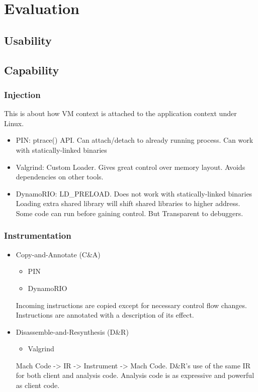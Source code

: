 
\section{Evaluation}
\label{sec:evaluation}
\subsection{Usability}
\subsection{Capability}
\subsubsection{Injection}
This is about how VM context is attached to the application context under Linux.
\begin{itemize}
	\item PIN: ptrace() API.
	Can attach/detach to already running process.
	Can work with statically-linked binaries
	\item Valgrind: Custom Loader.
	Gives great control over memory layout.
	Avoids dependencies on other tools.
	\item DynamoRIO: LD\_PRELOAD.
	Does not work with statically-linked binaries
	Loading extra shared library will shift shared libraries to higher address.
	Some code can run before gaining control.
	But Transparent to debuggers.
\end{itemize}
\subsubsection{Instrumentation}
\begin{itemize}
	\item Copy-and-Annotate (C\&A)
	\begin{itemize}
		\item PIN 
		\item DynamoRIO
	\end{itemize}
	Incoming instructions are copied except for necessary control flow changes.
	Instructions are annotated with a description of its effect.
	\item Disassemble-and-Resynthesis (D\&R)
	\begin{itemize}
		\item Valgrind
	\end{itemize}
	Mach Code -> IR -> Instrument -> Mach Code.
	D\&R's  use of the same IR for both client and analysis code.
	Analysis code is as expressive and powerful as client code. 
\end{itemize}
